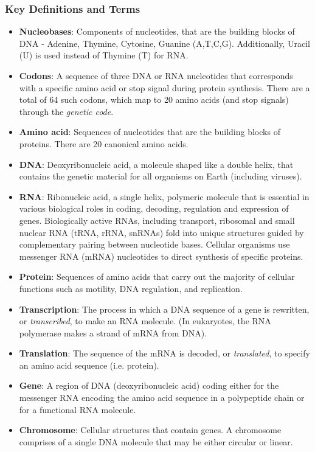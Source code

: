 \subsubsection{Key Definitions and Terms}
\begin{itemize}
    \item \textbf{Nucleobases}: Components of nucleotides, that are the building blocks of DNA - Adenine, Thymine, Cytosine, Guanine (A,T,C,G). Additionally, Uracil (U) is used instead of Thymine (T) for RNA.
    \item \textbf{Codons}: A sequence of three DNA or RNA nucleotides that corresponds with a specific amino acid or stop signal during protein synthesis. There are a total of 64 such codons, which map to 20 amino acids (and stop signals) through the \textit{genetic code}.
    \item \textbf{Amino acid}: Sequences of nucleotides that are the building blocks of proteins. There are 20 canonical amino acids.
    \item \textbf{DNA}: Deoxyribonucleic acid, a molecule shaped like a double helix, that contains the genetic material for all organisms on Earth (including viruses).
    \item \textbf{RNA}: Ribonucleic acid, a single helix, polymeric molecule that is essential in various biological roles in coding, decoding, regulation and expression of genes. Biologically active RNAs, including transport, ribosomal and small nuclear RNA (tRNA, rRNA, snRNAs) fold into unique structures guided by complementary pairing between nucleotide bases.
    Cellular organisms use messenger RNA (mRNA) nucleotides to direct synthesis of specific proteins.
    \item \textbf{Protein}: Sequences of amino acids that carry out the majority of cellular functions such as motility, DNA regulation, and replication.
    \item \textbf{Transcription}: The process in which a DNA sequence of a gene is rewritten, or \textit{transcribed}, to make an RNA molecule. (In eukaryotes, the RNA polymerase makes a strand of mRNA from DNA).
    \item \textbf{Translation}: The sequence of the mRNA is decoded, or \textit{translated}, to specify an amino acid sequence (i.e. protein).
    \item \textbf{Gene}: A region of DNA (deoxyribonucleic acid) coding either for the messenger RNA encoding the amino acid sequence in a polypeptide chain or for a functional RNA molecule.
    \item \textbf{Chromosome}: Cellular structures that contain genes. A chromosome comprises of a single DNA molecule that may be either circular or linear.

\end{itemize}
